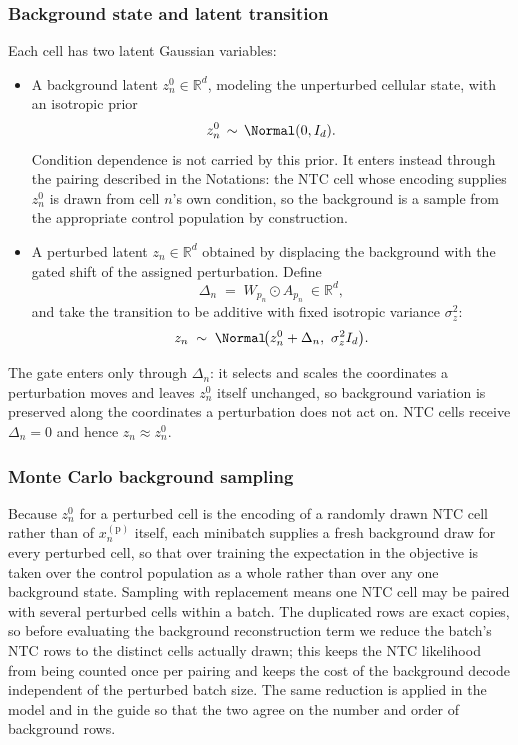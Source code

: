 \subsubsection{Background state and latent transition}
Each cell has two latent Gaussian variables:
\begin{itemize}
\item A background latent $z^0_n \in \mathbb{R}^d$, modeling the unperturbed cellular state, with an
isotropic prior
\begin{align}
  z^0_n \,\sim\, \Normal(0, I_d).
\end{align}
Condition dependence is not carried by this prior. It enters instead through the pairing described
in the Notations: the NTC cell whose encoding supplies $z^0_n$ is drawn from cell $n$'s own
condition, so the background is a sample from the appropriate control population by construction.
\item A perturbed latent $z_n \in \mathbb{R}^d$ obtained by displacing the background with the gated
shift of the assigned perturbation. Define
\[
\Delta_{n} \;=\; W_{p_n} \odot A_{p_n}\ \in \mathbb{R}^d,
\]
and take the transition to be additive with fixed isotropic variance $\sigma_z^2$:
\begin{align}
  z_n \;\sim\; \Normal\!\big(z^0_n + \Delta_n,\ \sigma_z^2 I_d\big).
  \label{eq:linear-shift}
\end{align}
\end{itemize}
The gate enters only through $\Delta_n$: it selects and scales the coordinates a perturbation moves
and leaves $z^0_n$ itself unchanged, so background variation is preserved along the coordinates a
perturbation does not act on. NTC cells receive $\Delta_n = 0$ and hence $z_n \approx z^0_n$.

\subsubsection{Monte Carlo background sampling}
Because $z^0_n$ for a perturbed cell is the encoding of a randomly drawn NTC cell rather than of
$x^{(\mathrm{p})}_n$ itself, each minibatch supplies a fresh background draw for every perturbed
cell, so that over training the expectation in the objective is taken over the control population as
a whole rather than over any one background state. Sampling with replacement means one NTC cell may be
paired with several perturbed cells within a batch. The duplicated rows are exact copies, so before
evaluating the background reconstruction term we reduce the batch's NTC rows to the distinct cells
actually drawn; this keeps the NTC likelihood from being counted once per pairing and keeps the cost
of the background decode independent of the perturbed batch size. The same reduction is applied in
the model and in the guide so that the two agree on the number and order of background rows.

